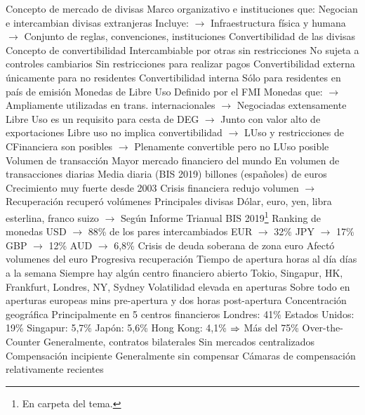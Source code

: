 \documentclass{nuevotema}
\begin{document}
\begin{esquemal}
			\3 Concepto de mercado de divisas
				\4 Marco organizativo e instituciones que:
				\4[] Negocian e intercambian divisas extranjeras
				\4 Incluye:
				\4[] $\to$ Infraestructura física y humana
				\4[] $\to$ Conjunto de reglas, convenciones, instituciones
			\3 Convertibilidad de las divisas
				\4 Concepto de convertibilidad
				\4[] Intercambiable por otras sin restricciones
				\4[] No sujeta a controles cambiarios
				\4[] Sin restricciones para realizar pagos
				\4 Convertibilidad externa
				\4[] únicamente para no residentes
				\4 Convertibilidad interna
				\4[] Sólo para residentes en país de emisión
			\3 Monedas de Libre Uso
				\4 Definido por el FMI
				\4[] Monedas que:
				\4[] $\to$ Ampliamente utilizadas en trans. internacionales
				\4[] $\to$ Negociadas extensamente
				\4 Libre Uso es un requisito para cesta de DEG
				\4[] $\to$ Junto con valor alto de exportaciones
				\4 Libre uso no implica convertibilidad
				\4[] $\to$ LUso y restricciones de CFinanciera son posibles
				\4[] $\to$ Plenamente convertible pero no LUso posible
			\3 Volumen de transacción
				\4 Mayor mercado financiero del mundo
				\4[] En volumen de transacciones diarias
				\4 Media diaria (BIS 2019)
				 billones (españoles) de euros
				\4 Crecimiento muy fuerte desde 2003
				\4 Crisis financiera redujo volumen
				\4[] $\to$ Recuperación recuperó volúmenes
			\3 Principales divisas
				\4 Dólar, euro, yen, libra esterlina, franco suizo
				\4[] $\to$ Según Informe Trianual BIS 2019\footnote{En carpeta del tema.}
				\4 Ranking de monedas
				\4[] USD $\to$ 88\% de los pares intercambiados
				\4[] EUR $\to$ 32\%
				\4[] JPY $\to$ 17\%
				\4[] GBP $\to$ 12\%
				\4[] AUD $\to$ 6,8\%
				\4 Crisis de deuda soberana de zona euro
				\4[] Afectó volumenes del euro
				\4[] Progresiva recuperación
			\3 Tiempo de apertura
				 horas al día
				 días a la semana
				\4 Siempre hay algún centro financiero abierto
				\4[] Tokio, Singapur, HK,  Frankfurt, Londres, NY, Sydney
				\4 Volatilidad elevada en aperturas
				\4[] Sobre todo en aperturas europeas
				 mins pre-apertura y dos horas post-apertura
			\3 Concentración geográfica
				\4 Principalmente en 5 centros financieros
				\4[] Londres: 41\%
				\4[] Estados Unidos: 19\%
				\4[] Singapur: 5,7\%
				\4[] Japón: 5,6\%
				\4[] Hong Kong: 4,1\%
				\4[] $\Rightarrow$ Más del 75\%
			\3 Over-the-Counter
				\4 Generalmente, contratos bilaterales
				\4 Sin mercados centralizados
				\4 Compensación incipiente
				\4[] Generalmente sin compensar
				\4[] Cámaras de compensación relativamente recientes

\end{esquemal}
\end{document}
